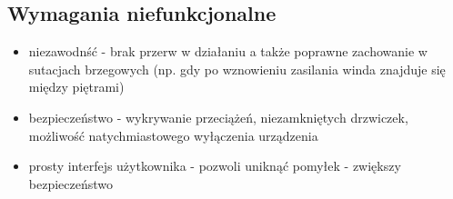 \documentclass[a4paper,11pt]{article}
\begin{document}
    \subsection{Wymagania niefunkcjonalne}
    	\begin{itemize}
    		\item niezawodnść - brak przerw w działaniu a także poprawne zachowanie w sutacjach brzegowych
    		 (np. gdy po wznowieniu zasilania winda znajduje się między piętrami)
    		\item bezpieczeństwo - wykrywanie przeciążeń, niezamkniętych drzwiczek, możliwość natychmiastowego wyłączenia urządzenia 
    		\item prosty interfejs użytkownika - pozwoli uniknąć pomyłek - zwiększy bezpieczeństwo
    	\end{itemize}
    	
\end{document}

